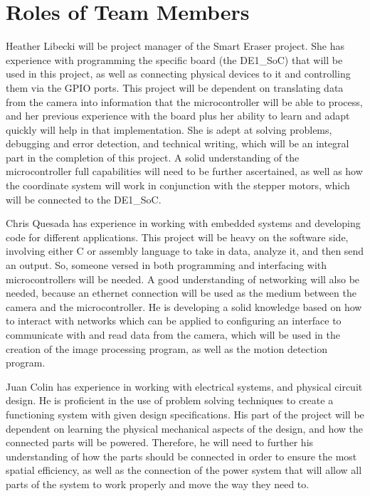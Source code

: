 \section{Roles of Team Members}
 Heather Libecki will be project manager of the Smart Eraser project. She has experience with programming the specific board (the DE1\_SoC) that will be used in this project, as well as connecting physical devices to it and controlling them via the GPIO ports. This project will be dependent on translating data from the camera into information that the microcontroller will be able to process, and her previous experience with the board plus her ability to learn and adapt quickly will help in that implementation. She is adept at solving problems, debugging and error detection, and technical writing, which will be an integral part in the completion of this project. A solid understanding of the microcontroller full capabilities will need to be further ascertained, as well as how the coordinate system will work in conjunction with the stepper motors, which will be connected to the DE1\_SoC. \par
 \setlength{\parindent}{5ex}
 Chris Quesada has experience in working with embedded systems and developing code for different applications. This project will be heavy on the software side, involving either C or assembly language to take in data, analyze it, and then send an output. So, someone versed in both programming and interfacing with microcontrollers will be needed. A good understanding of networking will also be needed, because an ethernet connection will be used as the medium between the camera and the microcontroller. He is developing a solid knowledge based on how to interact with networks which can be applied to configuring an interface to communicate with and read data from the camera, which will be used in the creation of the image processing program, as well as the motion detection program.\par
 \setlength{\parindent}{5ex}
 Juan Colin has experience in working with electrical systems, and physical circuit design. He is proficient in the use of problem solving techniques to create a functioning system with given design specifications. His part of the project will be dependent on learning the physical mechanical aspects of the design, and how the connected parts will be powered. Therefore, he will need to further his understanding of how the parts should be connected in order to ensure the most spatial efficiency, as well as the connection of the power system that will allow all parts of the system to work properly and move the way they need to.
 
